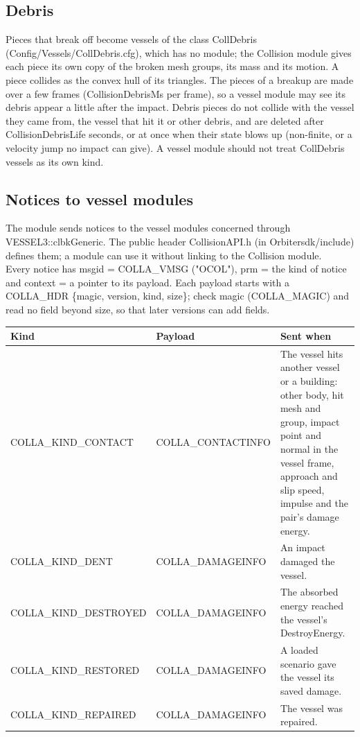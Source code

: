 \documentclass[Orbiter Developer Manual.tex]{subfiles}
\begin{document}
\begin{sloppypar}
\subsection{Debris}
Pieces that break off become vessels of the class CollDebris (Config/Vessels/CollDebris.cfg), which has no module; the Collision module gives each piece its own copy of the broken mesh groups, its mass and its motion. A piece collides as the convex hull of its triangles. The pieces of a breakup are made over a few frames (CollisionDebrisMs per frame), so a vessel module may see its debris appear a little after the impact. Debris pieces do not collide with the vessel they came from, the vessel that hit it or other debris, and are deleted after CollisionDebrisLife seconds, or at once when their state blows up (non-finite, or a velocity jump no impact can give). A vessel module should not treat CollDebris vessels as its own kind.


\subsection{Notices to vessel modules}
The module sends notices to the vessel modules concerned through VESSEL3::clbkGeneric. The public header CollisionAPI.h (in Orbitersdk/include) defines them; a module can use it without linking to the Collision module.\\
Every notice has msgid = COLLA\_VMSG ("OCOL"), prm = the kind of notice and context = a pointer to its payload. Each payload starts with a COLLA\_HDR \{magic, version, kind, size\}; check magic (COLLA\_MAGIC) and read no field beyond size, so that later versions can add fields.

	\begin{longtable}{ |p{}|p{}|p{}| }
	\hline\rule{0pt}{2ex}
	\textbf{Kind} & \textbf{Payload} & \textbf{Sent when}\\
	\hline\rule{0pt}{2ex}
	COLLA\_KIND\_CONTACT & COLLA\_CONTACTINFO & The vessel hits another vessel or a building: other body, hit mesh and group, impact point and normal in the vessel frame, approach and slip speed, impulse and the pair's damage energy.\\
	\hline\rule{0pt}{2ex}
	COLLA\_KIND\_DENT & COLLA\_DAMAGEINFO & An impact damaged the vessel.\\
	\hline\rule{0pt}{2ex}
	COLLA\_KIND\_DESTROYED & COLLA\_DAMAGEINFO & The absorbed energy reached the vessel's DestroyEnergy.\\
	\hline\rule{0pt}{2ex}
	COLLA\_KIND\_RESTORED & COLLA\_DAMAGEINFO & A loaded scenario gave the vessel its saved damage.\\
	\hline\rule{0pt}{2ex}
	COLLA\_KIND\_REPAIRED & COLLA\_DAMAGEINFO & The vessel was repaired.\\
	\hline
	\end{longtable}


\end{sloppypar}
\end{document}
